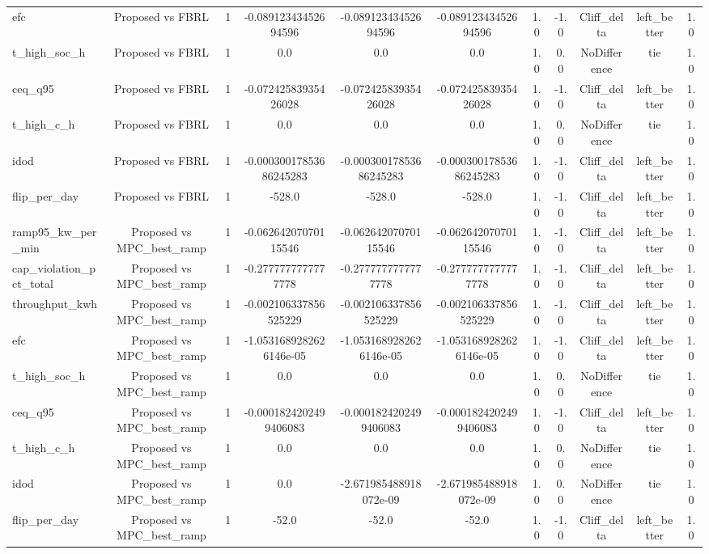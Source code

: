 \begin{table}[t]
\begin{tabular}{lcccccccccc}
efc & Proposed vs FBRL & 1 & -0.08912343452694596 & -0.08912343452694596 & -0.08912343452694596 & 1.0 & -1.0 & Cliff\_delta & left\_better & 1.0 \\
t\_high\_soc\_h & Proposed vs FBRL & 1 & 0.0 & 0.0 & 0.0 & 1.0 & 0.0 & NoDifference & tie & 1.0 \\
ceq\_q95 & Proposed vs FBRL & 1 & -0.07242583935426028 & -0.07242583935426028 & -0.07242583935426028 & 1.0 & -1.0 & Cliff\_delta & left\_better & 1.0 \\
t\_high\_c\_h & Proposed vs FBRL & 1 & 0.0 & 0.0 & 0.0 & 1.0 & 0.0 & NoDifference & tie & 1.0 \\
idod & Proposed vs FBRL & 1 & -0.00030017853686245283 & -0.00030017853686245283 & -0.00030017853686245283 & 1.0 & -1.0 & Cliff\_delta & left\_better & 1.0 \\
flip\_per\_day & Proposed vs FBRL & 1 & -528.0 & -528.0 & -528.0 & 1.0 & -1.0 & Cliff\_delta & left\_better & 1.0 \\
ramp95\_kw\_per\_min & Proposed vs MPC\_best\_ramp & 1 & -0.06264207070115546 & -0.06264207070115546 & -0.06264207070115546 & 1.0 & -1.0 & Cliff\_delta & left\_better & 1.0 \\
cap\_violation\_pct\_total & Proposed vs MPC\_best\_ramp & 1 & -0.2777777777777778 & -0.2777777777777778 & -0.2777777777777778 & 1.0 & -1.0 & Cliff\_delta & left\_better & 1.0 \\
throughput\_kwh & Proposed vs MPC\_best\_ramp & 1 & -0.002106337856525229 & -0.002106337856525229 & -0.002106337856525229 & 1.0 & -1.0 & Cliff\_delta & left\_better & 1.0 \\
efc & Proposed vs MPC\_best\_ramp & 1 & -1.0531689282626146e-05 & -1.0531689282626146e-05 & -1.0531689282626146e-05 & 1.0 & -1.0 & Cliff\_delta & left\_better & 1.0 \\
t\_high\_soc\_h & Proposed vs MPC\_best\_ramp & 1 & 0.0 & 0.0 & 0.0 & 1.0 & 0.0 & NoDifference & tie & 1.0 \\
ceq\_q95 & Proposed vs MPC\_best\_ramp & 1 & -0.0001824202499406083 & -0.0001824202499406083 & -0.0001824202499406083 & 1.0 & -1.0 & Cliff\_delta & left\_better & 1.0 \\
t\_high\_c\_h & Proposed vs MPC\_best\_ramp & 1 & 0.0 & 0.0 & 0.0 & 1.0 & 0.0 & NoDifference & tie & 1.0 \\
idod & Proposed vs MPC\_best\_ramp & 1 & 0.0 & -2.671985488918072e-09 & -2.671985488918072e-09 & 1.0 & 0.0 & NoDifference & tie & 1.0 \\
flip\_per\_day & Proposed vs MPC\_best\_ramp & 1 & -52.0 & -52.0 & -52.0 & 1.0 & -1.0 & Cliff\_delta & left\_better & 1.0 \\

\end{tabular}
\end{table}
